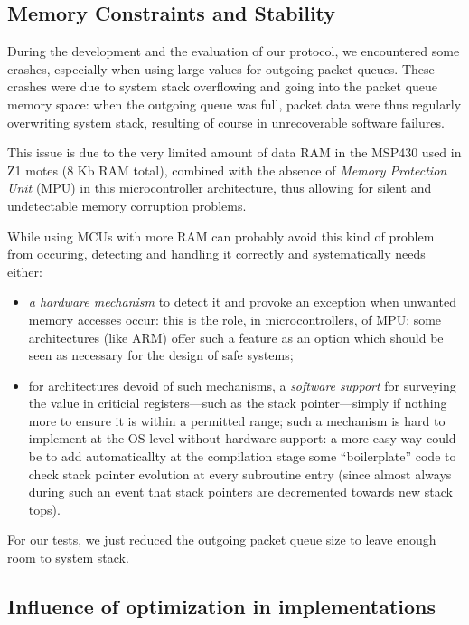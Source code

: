 \documentclass[conference]{IEEEtran}
\begin{document}
\subsection{Memory Constraints and Stability}

During the development and the evaluation of our protocol, we encountered
some crashes, especially when using large values for outgoing packet queues.
These crashes were due to system stack overflowing and going into the
packet queue memory space: when the outgoing queue was full, packet data
were thus regularly overwriting system stack, resulting of course in
unrecoverable software failures.

This issue is due to the very limited amount of data RAM in the MSP430 used
in Z1 motes (8 Kb RAM total), combined with the absence of \emph{Memory
Protection Unit} (MPU) in this microcontroller architecture, thus allowing
for silent and undetectable memory corruption problems.

While using MCUs with more RAM can probably avoid this kind of problem from
occuring, detecting and handling it correctly and systematically needs either:
\begin{itemize}
\item \emph{a hardware mechanism} to detect it and provoke an exception when
      unwanted memory accesses occur: this is the role, in microcontrollers,
      of MPU; some architectures (like ARM) offer such a feature as an option
      which should be seen as necessary for the design of safe systems;
\item for architectures devoid of such mechanisms, a \emph{software support}
      for surveying the value in criticial registers---such as the stack
      pointer---simply if nothing more to ensure it is within a permitted
      range; such a mechanism is hard to implement at the OS level without
      hardware support: a more easy way could be to add automaticallty at the
      compilation stage some ``boilerplate'' code to check stack pointer
      evolution at every subroutine entry (since almost always during such an
      event that stack pointers are decremented towards new stack tops).
\end{itemize}

For our tests, we just reduced the outgoing packet queue size to leave
enough room to system stack.


\subsection{Influence of optimization in implementations}
\end{document}
